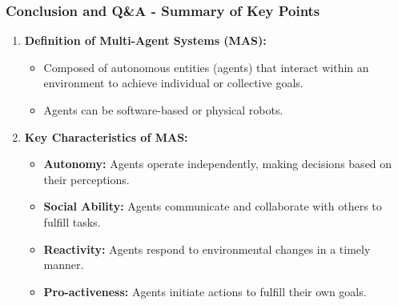 \documentclass[aspectratio=169]{beamer}
\begin{document}
\begin{frame}[fragile]
    \frametitle{Conclusion and Q\&A - Summary of Key Points}
    
    \begin{enumerate}
        \item \textbf{Definition of Multi-Agent Systems (MAS):}
        \begin{itemize}
            \item Composed of autonomous entities (agents) that interact within an environment to achieve individual or collective goals.
            \item Agents can be software-based or physical robots.
        \end{itemize}
        
        \item \textbf{Key Characteristics of MAS:}
        \begin{itemize}
            \item \textbf{Autonomy:} Agents operate independently, making decisions based on their perceptions.
            \item \textbf{Social Ability:} Agents communicate and collaborate with others to fulfill tasks.
            \item \textbf{Reactivity:} Agents respond to environmental changes in a timely manner.
            \item \textbf{Pro-activeness:} Agents initiate actions to fulfill their own goals.
        \end{itemize}
    \end{enumerate}
\end{frame}
\end{document}
